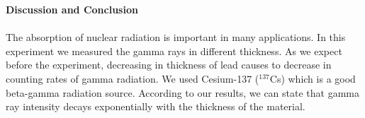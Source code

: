 \documentclass[a4paper,12pt]{article}
\begin{document}
\newpage
\textbf{Discussion and Conclusion}\\\\
The absorption of nuclear radiation is important in many applications. In this experiment we measured the gamma rays in different thickness. As we expect before the experiment, decreasing in thickness of lead causes to decrease in counting rates of gamma radiation. We used Cesium-137 ($^{137}$Cs) which is a good beta-gamma radiation source. According to our results, we can state that gamma ray intensity decays exponentially with the thickness of the material.
\end{document}
